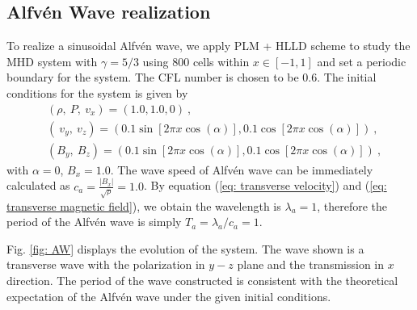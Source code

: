 \documentclass[10.5pt]{article}
\begin{document}
\subsection{Alfv\'en Wave realization}
To realize a sinusoidal Alfv\'en wave, we apply PLM + HLLD scheme to 
study the MHD system with $\gamma = 5/3$ 
using 800 cells within $x\in[-1,1]$ and set a periodic boundary for the system. 
The CFL number is chosen to be 0.6.
The initial conditions for the system is given by 
\begin{align}
&(\rho,\ P,\ v_x) = (1.0,1.0,0) \ , \\
&(\ v_y,\ v_z) = (0.1 \sin[2 \pi x  \cos(\alpha)], 0.1 \cos[2 \pi x  \cos(\alpha)]) \ , 
\label{eq: transverse velocity}\\
&(B_y,\ B_z) = (0.1 \sin[2 \pi x  \cos(\alpha)], 0.1 \cos[2 \pi x  \cos(\alpha)]) \ , 
\label{eq: transverse magnetic field}
\end{align}
with $\alpha=0$, $B_x=1.0$.
The wave speed of Alfv\'en wave can be immediately calculated as 
$c_a = \frac{|B_x|}{\sqrt{\rho}} = 1.0$. By equation (\ref{eq: transverse velocity}) 
and (\ref{eq: transverse magnetic field}), we obtain the wavelength is $\lambda_a=1$,
therefore the period of the Alfv\'en wave is simply $T_a = \lambda_a / c_a =1$.

Fig. \ref{fig: AW} displays the evolution of the system. The wave shown is a transverse wave 
with the polarization in $y-z$ plane and the transmission in $x$ direction.
The period of the wave constructed is consistent with the theoretical expectation of the 
Alfv\'en wave under the given initial conditions.
\end{document}
